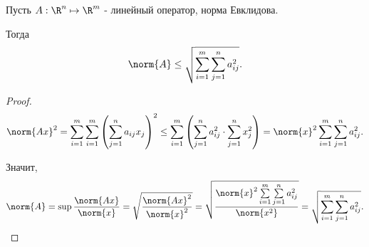 \begin{theorem} \thmslashn

    Пусть $A : \R^{n} \mapsto \R^{m}$ - линейный оператор, норма Евклидова.

    Тогда
    \[ \norm{A} \le \sqrt{\sum\limits_{i=1}^{m}\sum\limits_{j=1}^{n} a_{ij}^2}  .\]
    \begin{proof} \thmslashn
    
        \[ \norm{Ax}^2 = \sum\limits_{i=1}^{m} \sum\limits_{i=1}^{m} \left( \sum\limits_{j=1}^{n} a_{ij}x_{j} \right)^2 \le \sum\limits_{i=1}^{m}\left( \sum\limits_{j=1}^{n} a_{ij}^2 \cdot \sum\limits_{j=1}^{n} x_{j}^2 \right) = \norm{x}^2 \sum\limits_{i=1}^{m}\sum\limits_{j=1}^{n} a_{ij}^2  .\]

        Значит,
        \[ \norm{A} = \sup \frac{\norm{Ax}}{\norm{x}} = \sqrt{\frac{\norm{Ax}^2}{\norm{x}^2}} = \sqrt{\frac{\norm{x}^2 \sum\limits_{i=1}^{m} \sum\limits_{j=1}^{n} a_{ij}^2}{\norm{x^2}}} = \sqrt{\sum\limits_{i=1}^{m} \sum\limits_{j=1}^{n} a_{ij}^2}    .\qedhere\] 
    \end{proof}
\end{theorem}
